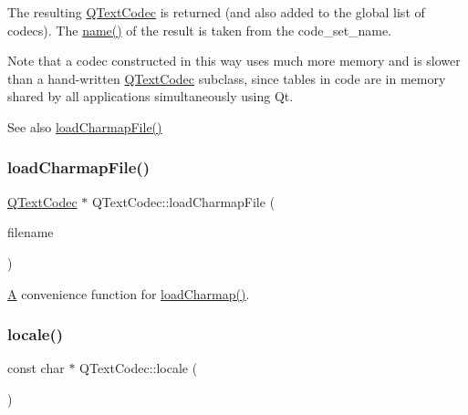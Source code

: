 The resulting \mbox{\hyperlink{class_q_text_codec}{Q\+Text\+Codec}} is returned (and also added to the global list of codecs). The \mbox{\hyperlink{class_q_text_codec_a5b735ce19dc6b0fb0e8858bd3f54f0e2}{name()}} of the result is taken from the code\+\_\+set\+\_\+name.

Note that a codec constructed in this way uses much more memory and is slower than a hand-\/written \mbox{\hyperlink{class_q_text_codec}{Q\+Text\+Codec}} subclass, since tables in code are in memory shared by all applications simultaneously using Qt.

\begin{DoxySeeAlso}{See also}
\mbox{\hyperlink{class_q_text_codec_a655a88489c4308af769f992617a5ec53}{load\+Charmap\+File()}} 
\end{DoxySeeAlso}
\mbox{\label{class_q_text_codec_a655a88489c4308af769f992617a5ec53}} 
\subsubsection{\texorpdfstring{loadCharmapFile()}{loadCharmapFile()}}
{\footnotesize\ttfamily \mbox{\hyperlink{class_q_text_codec}{Q\+Text\+Codec}} $\ast$ Q\+Text\+Codec\+::load\+Charmap\+File (\begin{DoxyParamCaption}\item[{\mbox{\hyperlink{class_q_string}{Q\+String}}}]{filename }\end{DoxyParamCaption})\hspace{0.3cm}{\ttfamily [static]}}

\mbox{\hyperlink{class_a}{A}} convenience function for \mbox{\hyperlink{class_q_text_codec_acf1f7d7dc7f47e434b269eb8efd458de}{load\+Charmap()}}. \mbox{\label{class_q_text_codec_aafe5cdca0b371b80f87be4d6e131d4a8}} 
\subsubsection{\texorpdfstring{locale()}{locale()}}
{\footnotesize\ttfamily const char $\ast$ Q\+Text\+Codec\+::locale (\begin{DoxyParamCaption}{ }\end{DoxyParamCaption})\hspace{0.3cm}{\ttfamily [static]}}

